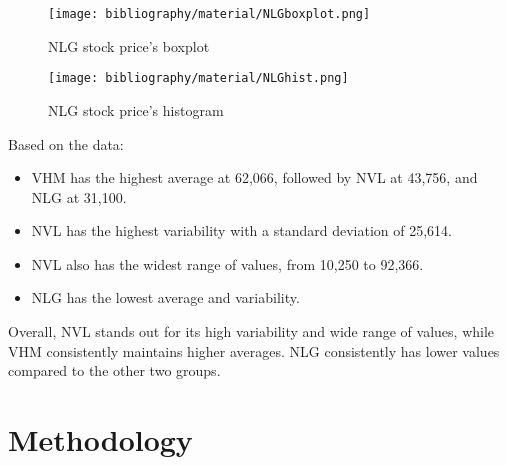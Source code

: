 \documentclass{ieeeojies}
\begin{document}
	\begin{figure}[H]
		\centering
		\begin{minipage}{0.23\textwidth}
			\centering
			\texttt{[image: bibliography/material/NLGboxplot.png]}
			\caption{NLG stock price's boxplot}
			\label{fig:1}
		\end{minipage}
		\hfill
		\begin{minipage}{0.23\textwidth}
			\centering
			\texttt{[image: bibliography/material/NLGhist.png]}
			\caption{NLG stock price's histogram}
			\label{fig:2}
		\end{minipage}
	\end{figure}
	Based on the data:
	\begin{itemize}
		\item VHM has the highest average at 62,066, followed by NVL at 43,756, and NLG at
		31,100.
		\item NVL has the highest variability with a standard deviation of 25,614.
		\item NVL also has the widest range of values, from 10,250 to 92,366.
		\item NLG has the lowest average and variability.
	\end{itemize}
	Overall, NVL stands out for its high variability and wide range of values, while VHM consistently maintains higher averages. NLG consistently has lower values compared to the other two groups.
	
	\section{Methodology}
\end{document}
